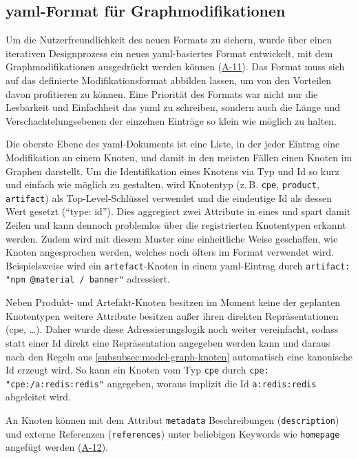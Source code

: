 \subsection{\acrshort{yaml}-Format für Graphmodifikationen}\label{subsec:modell-graph-modification-yaml}

Um die Nutzerfreundlichkeit des neuen Formats zu sichern, wurde über einen iterativen Designprozess ein neues \acrshort{yaml}-basiertes Format entwickelt, mit dem Graphmodifikationen ausgedrückt werden können (\hyperref[subsec:req-manual-format-modification-for-real]{A-11}).
Das Format muss sich auf das definierte Modifikationsformat abbilden lassen, um von den Vorteilen davon profitieren zu können.
Eine Priorität des Formats war nicht nur die Lesbarkeit und Einfachheit das \acrshort{yaml} zu schreiben, sondern auch die Länge und Verschachtelungsebenen der einzelnen Einträge so klein wie möglich zu halten.

Die oberste Ebene des \acrshort{yaml}-Dokuments ist eine Liste, in der jeder Eintrag eine Modifikation an einem Knoten, und damit in den meisten Fällen einen Knoten im Graphen darstellt.
Um die Identifikation eines Knotens via Typ und Id so kurz und einfach wie möglich zu gestalten, wird Knotentyp (z.\,B. \texttt{cpe}, \texttt{product}, \texttt{artifact}) als Top-Level-Schlüssel verwendet und die eindeutige Id als dessen Wert gesetzt (\enquote{type: id}).
Dies aggregiert zwei Attribute in eines und spart damit Zeilen und kann dennoch problemlos über die registrierten Knotentypen erkannt werden.
Zudem wird mit diesem Muster eine einheitliche Weise geschaffen, wie Knoten angesprochen werden, welches noch öfters im Format verwendet wird.
Beispielsweise wird ein \texttt{artefact}-Knoten in einem \acrshort{yaml}-Eintrag durch \texttt{artifact: "npm @material / banner"} adressiert.

Neben Produkt- und Artefakt-Knoten besitzen im Moment keine der geplanten Knotentypen weitere Attribute besitzen außer ihren direkten Repräsentationen (\acrshort{cpe}, \ldots).
Daher wurde diese Adressierungslogik noch weiter vereinfacht, sodass statt einer Id direkt eine Repräsentation angegeben werden kann und daraus nach den Regeln aus \autoref{subsubsec:model-graph-knoten} automatisch eine kanonische Id erzeugt wird.
So kann ein Knoten vom Typ \texttt{cpe} durch \texttt{cpe: "cpe:/a:redis:redis"} angegeben, woraus implizit die Id \texttt{a:redis:redis} abgeleitet wird.

An Knoten können mit dem Attribut \texttt{metadata} Beschreibungen (\texttt{description}) und externe Referenzen (\texttt{references}) unter beliebigen Keywords wie \texttt{homepage} angefügt werden (\hyperref[subsec:req-reason-format]{A-12}).

